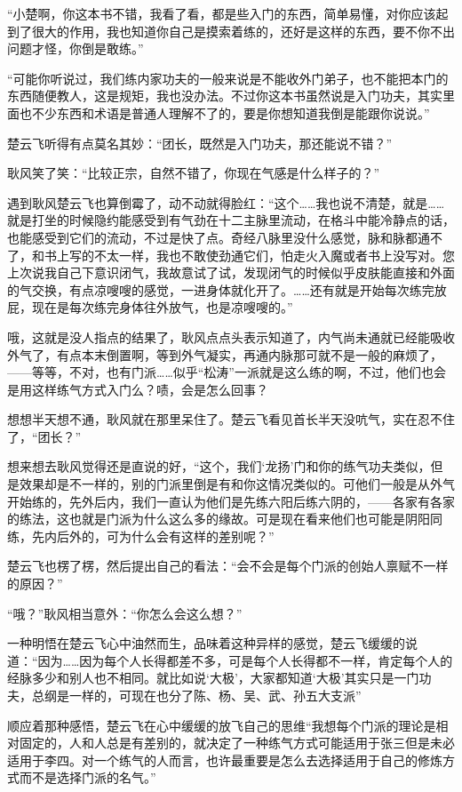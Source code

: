 “小楚啊，你这本书不错，我看了看，都是些入门的东西，简单易懂，对你应该起到了很大的作用，我也知道你自己是摸索着练的，还好是这样的东西，要不你不出问题才怪，你倒是敢练。”

“可能你听说过，我们练内家功夫的一般来说是不能收外门弟子，也不能把本门的东西随便教人，这是规矩，我也没办法。不过你这本书虽然说是入门功夫，其实里面也不少东西和术语是普通人理解不了的，要是你想知道我倒是能跟你说说。”

楚云飞听得有点莫名其妙：“团长，既然是入门功夫，那还能说不错？”

耿风笑了笑：“比较正宗，自然不错了，你现在气感是什么样子的？”

遇到耿风楚云飞也算倒霉了，动不动就得脸红：“这个……我也说不清楚，就是……就是打坐的时候隐约能感受到有气劲在十二主脉里流动，在格斗中能冷静点的话，也能感受到它们的流动，不过是快了点。奇经八脉里没什么感觉，脉和脉都通不了，和书上写的不太一样，我也不敢使劲通它们，怕走火入魔或者书上没写对。您上次说我自己下意识闭气，我故意试了试，发现闭气的时候似乎皮肤能直接和外面的气交换，有点凉嗖嗖的感觉，一进身体就化开了。……还有就是开始每次练完放屁，现在是每次练完身体往外放气，也是凉嗖嗖的。”

哦，这就是没人指点的结果了，耿风点点头表示知道了，内气尚未通就已经能吸收外气了，有点本末倒置啊，等到外气凝实，再通内脉那可就不是一般的麻烦了，——等等，不对，也有门派……似乎“松涛”一派就是这么练的啊，不过，他们也会是用这样练气方式入门么？啧，会是怎么回事？

想想半天想不通，耿风就在那里呆住了。楚云飞看见首长半天没吭气，实在忍不住了，“团长？”

想来想去耿风觉得还是直说的好，“这个，我们‘龙扬’门和你的练气功夫类似，但是效果却是不一样的，别的门派里倒是有和你这情况类似的。可他们一般是从外气开始练的，先外后内，我们一直认为他们是先练六阳后练六阴的，——各家有各家的练法，这也就是门派为什么这么多的缘故。可是现在看来他们也可能是阴阳同练，先内后外的，可为什么会有这样的差别呢？”

楚云飞也楞了楞，然后提出自己的看法：“会不会是每个门派的创始人禀赋不一样的原因？”

“哦？”耿风相当意外：“你怎么会这么想？”

一种明悟在楚云飞心中油然而生，品味着这种异样的感觉，楚云飞缓缓的说道：“因为……因为每个人长得都差不多，可是每个人长得都不一样，肯定每个人的经脉多少和别人也不相同。就比如说‘大极’，大家都知道‘大极’其实只是一门功夫，总纲是一样的，可现在也分了陈、杨、吴、武、孙五大支派”

顺应着那种感悟，楚云飞在心中缓缓的放飞自己的思维“我想每个门派的理论是相对固定的，人和人总是有差别的，就决定了一种练气方式可能适用于张三但是未必适用于李四。对一个练气的人而言，也许最重要是怎么去选择适用于自己的修炼方式而不是选择门派的名气。”

